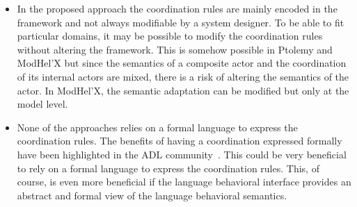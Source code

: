 \begin{itemize}
	\item In the proposed approach the coordination rules are mainly encoded in the framework and not always modifiable by a system designer. To be able to fit particular domains, it may be possible to modify the coordination rules without altering the framework. This is somehow possible in Ptolemy and ModHel'X but since the semantics of a composite actor and the coordination of its internal actors are mixed, there is a risk of altering the semantics of the actor. In ModHel'X, the semantic adaptation can be modified but only at the model level.
	
	\item None of the approaches relies on a formal language to express the coordination rules. The benefits of having a coordination expressed formally have been highlighted in the ADL community~\cite{wrightbib,rapidebib}. This could be very beneficial to rely on a formal language to express the coordination rules. This, of course, is even more beneficial if the language behavioral interface provides an abstract and formal view of the language behavioral semantics.
\end{itemize}

%	
%		
%		
%     
	
